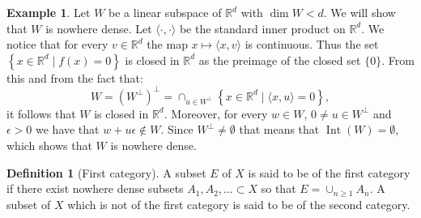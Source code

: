 \documentclass[11pt,a4paper]{article}
\theoremstyle{definition}
\newtheorem{definition}{Definition}[section]
\newtheorem{example}{Example}[section]
\theoremstyle{plain}
\DeclareMathOperator{\Int}{Int}
\newcommand{\R}{\mathbb{R}}
\newcommand{\ip}[2]{\langle #1, #2 \rangle}
\newcommand{\set}[2]{ \left\{ #1 \mid #2 \right\} }
\begin{document}
  \begin{example}
    Let $W$ be a linear subspace of $\R^d$ with $\dim W < d$. We will show
    that $W$ is nowhere dense. Let $\ip{\cdot}{\cdot}$ be the standard
    inner product on $\R^d$. We notice that for every $v \in \R^d$ the
    map $x \mapsto \ip{x}{v}$ is continuous. Thus the set 
    $\set{x \in \R^d}{f(x) = 0}$ is closed in $\R^d$ as the preimage of the
    closed set $\{0\}$. From this and from the fact that:
    \[
      W = (W^{\perp})^{\perp} = \cap_{u \in W^{\perp}}{\set{x \in \R^d}
      {\ip{x}{u} = 0}},
    \]
    it follows that $W$ is closed in $\R^d$. Moreover, for every $w \in W$,
    $0 \neq u \in W^{\perp}$ and $\epsilon > 0$ we have that 
    $w+u\epsilon \notin W$. Since $W^{\perp} \neq \emptyset$ that means that
    $\Int(W) = \emptyset$, which shows that $W$ is nowhere dense.
  \end{example}
  
  \begin{definition}[First category]
    A subset $E$ of $X$ is said to be of the first category if there exist
    nowhere dense subsets $A_1,A_2,\dots \subset X$ so that 
    $E = \cup_{n \geq 1}{A_n}$. A subset of $X$ which is not of the first 
    category is said to be of the second category.
  \end{definition}
\end{document}
